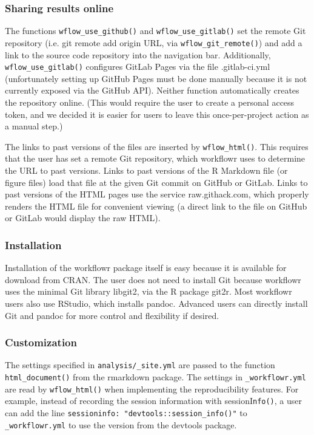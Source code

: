 \documentclass[9pt,a4paper]{extarticle}
\begin{document}
\subsubsection*{Sharing results online}

The functions \verb|wflow_use_github()| and \verb|wflow_use_gitlab()| set the remote
Git repository (i.e. git remote add origin URL, via \verb|wflow_git_remote()|)
and add a link to the source code repository into the navigation bar.
Additionally, \verb|wflow_use_gitlab()| configures GitLab Pages via the file
.gitlab-ci.yml (unfortunately setting up GitHub Pages must be done
manually because it is not currently exposed via the GitHub API).
Neither function automatically creates the repository online. (This
would require the user to create a personal access token, and we decided
it is easier for users to leave this once-per-project action as a manual
step.)

The links to past versions of the files are inserted by \verb|wflow_html()|.
This requires that the user has set a remote Git repository, which
workflowr uses to determine the URL to past versions. Links to past
versions of the R Markdown file (or figure files) load that file at the
given Git commit on GitHub or GitLab. Links to past versions of the HTML
pages use the service raw.githack.com, which properly renders the HTML
file for convenient viewing (a direct link to the file on GitHub or
GitLab would display the raw HTML).

\subsubsection*{Installation}

Installation of the workflowr package itself is easy because it is
available for download from CRAN. The user does not need to install Git
because workflowr uses the minimal Git library libgit2, via the R
package git2r. Most workflowr users also use RStudio, which installs
pandoc. Advanced users can directly install Git and pandoc for more
control and flexibility if desired.

\subsubsection*{Customization}

The settings specified in \verb|analysis/_site.yml| are passed to the
function \verb|html_document()| from the rmarkdown package. The settings in
\verb|_workflowr.yml| are read by \verb|wflow_html()| when implementing the
reproducibility features. For example, instead of recording the session
information with sessionI\verb|nfo()|, a user can add the line
\verb|sessioninfo: "devtools::session_info()"| to \verb|_workflowr.yml|
to use the version from the devtools package.
\end{document}
